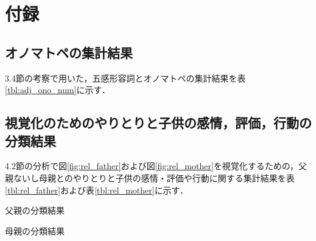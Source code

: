 \documentclass[japanese]{jnlp_1.4}
\begin{document}
\clearpage
\makeatletter
  \setcounter{section}{0}
  \setcounter{subsection}{0}
  \renewcommand{\thesection}{}
\makeatother


\section{付録}
\subsection{オノマトペの集計結果}

3.4節の考察で用いた，五感形容詞とオノマトペの集計結果を表\ref{tbl:adj_ono_num}に示す．


\subsection{視覚化のためのやりとりと子供の感情，評価，行動の分類結果}

4.2節の分析で図\ref{fig:rel_father}および図\ref{fig:rel_mother}を視覚化するための，父親ないし母親とのやりとりと子供の感情・評価や行動に関する集計結果を表\ref{tbl:rel_father}および表\ref{tbl:rel_mother}に示す．

\vspace{1\baselineskip}


\clearpage
\begin{table}[t]
\begin{flushright}
\hfill\begin{minipage}{95pt}
\caption{父親の分類結果}
\label{tbl:rel_father}
\end{minipage}
\par
\scalebox{0.78}{}
\end{flushright}
\vspace*{20pt}

\hfill\begin{minipage}{95pt}
\caption{母親の分類結果}
\label{tbl:rel_mother}
\end{minipage}
\scalebox{0.78}{}
\end{table}
\clearpage


\begin{table}[t]
\vspace{18pt}
\scalebox{0.78}{}
\vspace*{20pt}


\vspace{18pt}
\scalebox{0.78}{}
\end{table}

\clearpage

\begin{biography}
\end{biography}


\biodate
\end{document}
